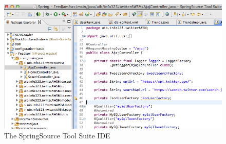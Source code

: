 \begin{figure}[ht]
    \begin{minipage}[b]{1\linewidth}
        \centering
        \includegraphics[width=1\textwidth]{figures/springsourcetoolsuite}
        \caption{The SpringSource Tool Suite IDE}
        \label{fig:springsourcetoolsuite}
    \end{minipage}
\end{figure}